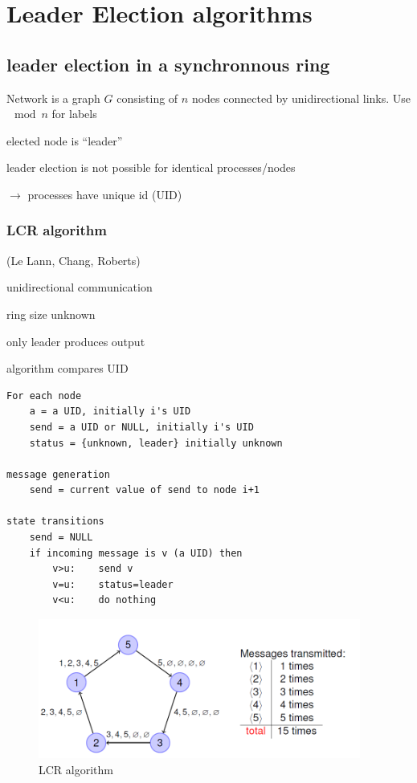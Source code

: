 \chapter{Leader Election algorithms}
\section{leader election in a synchronnous ring}
Network is a graph $G$ consisting of $n$ nodes connected by unidirectional links. Use $\mod n$ for labels\\
\begin{compactitem}
\item elected node is ``leader''
\item leader election is not possible for identical processes/nodes
\item $\rightarrow$ processes have unique id (UID)
\end{compactitem}

\subsection{LCR algorithm}
(Le Lann, Chang, Roberts)\\

\begin{compactitem}
\item unidirectional communication
\item ring size unknown
\item only leader produces output
\item algorithm compares UID
\end{compactitem}

\begin{lstlisting}
For each node
	a = a UID, initially i's UID
	send = a UID or NULL, initially i's UID
	status = {unknown, leader} initially unknown

message generation
	send = current value of send to node i+1

state transitions
	send = NULL
	if incoming message is v (a UID) then
		v>u: 	send v
		v=u: 	status=leader
		v<u: 	do nothing
\end{lstlisting}

\begin{figure}[h]
	\centering
	\includegraphics[width=400px]{gfx/lcr.png}
	\caption{LCR algorithm}
	\label{img:lcr}
\end{figure}

